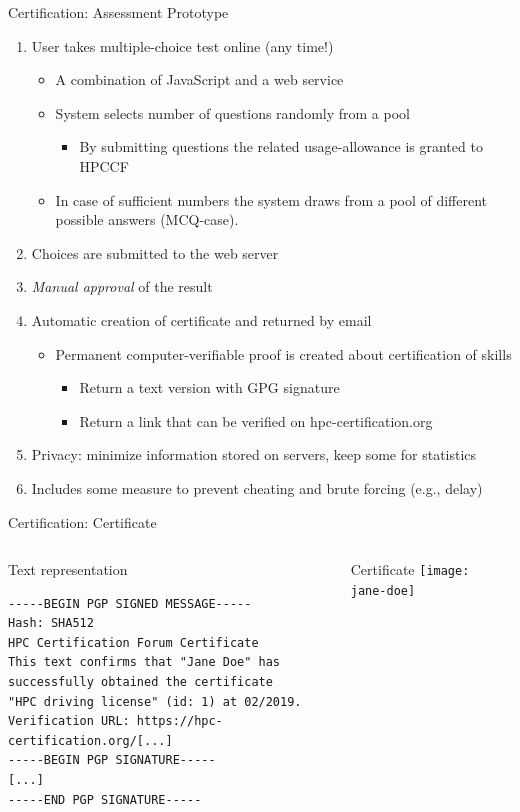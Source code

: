 \begin{frame}{Certification: Assessment Prototype}
		\begin{enumerate}
			\item User takes multiple-choice test online (any time!)
			\begin{itemize}
				\item A combination of JavaScript and a web service
				\item System selects number of questions randomly from a pool
					\begin{itemize}
						\item By submitting questions the related usage-allowance is granted to HPCCF
					\end{itemize}
				\item In case of sufficient numbers the system draws from a pool of different possible answers (MCQ-case).
			\end{itemize}
			\item Choices are submitted to the web server
			\item \textit{Manual approval} of the result
			\item Automatic creation of certificate and returned by email
			\begin{itemize}
							\item Permanent computer-verifiable proof is created about certification of skills
							\begin{itemize}
								\item Return a text version with GPG signature
								\item Return a link that can be verified on hpc-certification.org
							\end{itemize}
			\end{itemize}
			\item Privacy: minimize information stored on servers, keep some for statistics
			\item Includes some measure to prevent cheating and brute forcing (e.g., delay)
		\end{enumerate}
\end{frame}

\begin{frame}[fragile]{Certification: Certificate}
\begin{columns}
	\begin{block}{Text representation}

		\scriptsize
		\begin{verbatim}
-----BEGIN PGP SIGNED MESSAGE-----
Hash: SHA512
HPC Certification Forum Certificate
This text confirms that "Jane Doe" has
successfully obtained the certificate
"HPC driving license" (id: 1) at 02/2019.
Verification URL: https://hpc-certification.org/[...]
-----BEGIN PGP SIGNATURE-----
[...]
-----END PGP SIGNATURE-----
		\end{verbatim}
	\end{block}

	\begin{block}{Certificate}
		\medskip
		\texttt{[image: jane-doe]}
	\end{block}
\end{columns}
\end{frame}
